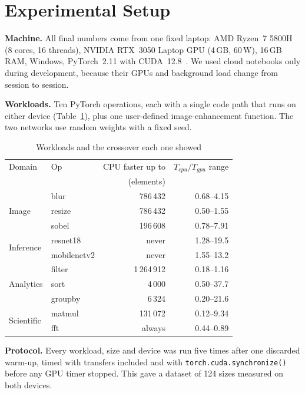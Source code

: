 \documentclass[conference]{IEEEtran}
\begin{document}
\section{Experimental Setup}
\label{sec:setup}

\textbf{Machine.} All final numbers come from one fixed laptop: AMD Ryzen~7 5800H (8 cores, 16 threads), NVIDIA RTX~3050 Laptop GPU (4\,GB, 60\,W), 16\,GB RAM, Windows, PyTorch~2.11 with CUDA~12.8~\cite{pytorch}. We used cloud notebooks only during development, because their GPUs and background load change from session to session.

\textbf{Workloads.} Ten PyTorch operations, each with a single code path that runs on either device (Table~\ref{tab:workloads}), plus one user-defined image-enhancement function. The two networks use random weights with a fixed seed.

\begin{table}[t]
\centering
\caption{Workloads and the crossover each one showed}
\label{tab:workloads}
\setlength{\tabcolsep}{3pt}
\begin{tabular}{@{}llrr@{}}
\toprule
Domain & Op & CPU faster up to & $T_{cpu}/T_{gpu}$ range \\
 & & (elements) & \\
\midrule
\multirow{3}{*}{Image} & blur & 786\,432 & 0.68--4.15 \\
 & resize & 786\,432 & 0.50--1.55 \\
 & sobel & 196\,608 & 0.78--7.91 \\
\multirow{2}{*}{Inference} & resnet18 & never & 1.28--19.5 \\
 & mobilenetv2 & never & 1.55--13.2 \\
\multirow{3}{*}{Analytics} & filter & 1\,264\,912 & 0.18--1.16 \\
 & sort & 4\,000 & 0.50--37.7 \\
 & groupby & 6\,324 & 0.20--21.6 \\
\multirow{2}{*}{Scientific} & matmul & 131\,072 & 0.12--9.34 \\
 & fft & always & 0.44--0.89 \\
\bottomrule
\end{tabular}
\end{table}

\textbf{Protocol.} Every workload, size and device was run five times after one discarded warm-up, timed with transfers included and with \texttt{torch.cuda.synchronize()} before any GPU timer stopped. This gave a dataset of 124 sizes measured on both devices.
\end{document}
